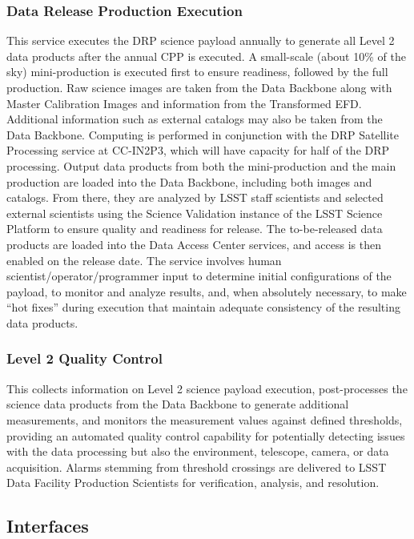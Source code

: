 \documentclass[DM,toc]{lsstdoc}
\begin{document}
\subsubsection{Data Release Production
Execution}\label{data-release-production-execution}

This service executes the DRP science payload annually to generate all
Level 2 data products after the annual CPP is executed. A small-scale
(about 10\% of the sky) mini-production is executed first to ensure
readiness, followed by the full production. Raw science images are taken
from the Data Backbone along with Master Calibration Images and
information from the Transformed EFD. Additional information such as
external catalogs may also be taken from the Data Backbone. Computing is
performed in conjunction with the DRP Satellite Processing service at
CC-IN2P3, which will have capacity for half of the DRP processing.
Output data products from both the mini-production and the main
production are loaded into the Data Backbone, including both images and
catalogs. From there, they are analyzed by LSST staff scientists and
selected external scientists using the Science Validation instance of
the LSST Science Platform to ensure quality and readiness for release.
The to-be-released data products are loaded into the Data Access Center
services, and access is then enabled on the release date. The service
involves human scientist/operator/programmer input to determine initial
configurations of the payload, to monitor and analyze results, and, when
absolutely necessary, to make ``hot fixes'' during execution that
maintain adequate consistency of the resulting data products.

\subsubsection{Level 2 Quality Control}\label{level-2-quality-control}

This collects information on Level 2 science payload execution,
post-processes the science data products from the Data Backbone to
generate additional measurements, and monitors the measurement values
against defined thresholds, providing an automated quality control
capability for potentially detecting issues with the data processing but
also the environment, telescope, camera, or data acquisition. Alarms
stemming from threshold crossings are delivered to LSST Data Facility
Production Scientists for verification, analysis, and resolution.

\subsection{Interfaces}\label{ncsa-l2-interfaces}
\end{document}
